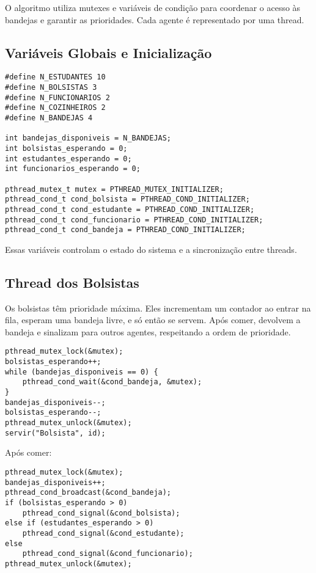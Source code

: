 \documentclass[10pt,a4paper]{article}
\begin{document}
O algoritmo utiliza mutexes e variáveis de condição para coordenar o acesso às bandejas e garantir as prioridades. Cada agente é representado por uma thread.

\subsection{Variáveis Globais e Inicialização}

\begin{verbatim}
#define N_ESTUDANTES 10
#define N_BOLSISTAS 3
#define N_FUNCIONARIOS 2
#define N_COZINHEIROS 2
#define N_BANDEJAS 4

int bandejas_disponiveis = N_BANDEJAS;
int bolsistas_esperando = 0;
int estudantes_esperando = 0;
int funcionarios_esperando = 0;

pthread_mutex_t mutex = PTHREAD_MUTEX_INITIALIZER;
pthread_cond_t cond_bolsista = PTHREAD_COND_INITIALIZER;
pthread_cond_t cond_estudante = PTHREAD_COND_INITIALIZER;
pthread_cond_t cond_funcionario = PTHREAD_COND_INITIALIZER;
pthread_cond_t cond_bandeja = PTHREAD_COND_INITIALIZER;
\end{verbatim}
Essas variáveis controlam o estado do sistema e a sincronização entre threads.

\subsection{Thread dos Bolsistas}

Os bolsistas têm prioridade máxima. Eles incrementam um contador ao entrar na fila, esperam uma bandeja livre, e só então se servem. Após comer, devolvem a bandeja e sinalizam para outros agentes, respeitando a ordem de prioridade.

\begin{verbatim}
pthread_mutex_lock(&mutex);
bolsistas_esperando++;
while (bandejas_disponiveis == 0) {
    pthread_cond_wait(&cond_bandeja, &mutex);
}
bandejas_disponiveis--;
bolsistas_esperando--;
pthread_mutex_unlock(&mutex);
servir("Bolsista", id);
\end{verbatim}

Após comer:
\begin{verbatim}
pthread_mutex_lock(&mutex);
bandejas_disponiveis++;
pthread_cond_broadcast(&cond_bandeja);
if (bolsistas_esperando > 0)
    pthread_cond_signal(&cond_bolsista);
else if (estudantes_esperando > 0)
    pthread_cond_signal(&cond_estudante);
else
    pthread_cond_signal(&cond_funcionario);
pthread_mutex_unlock(&mutex);
\end{verbatim}
\end{document}
